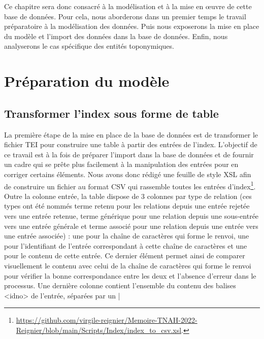 \documentclass[a4paper,12pt,twoside]{book}
\begin{document}
	Ce chapitre sera donc consacré à la modélisation et à la mise en œuvre de cette base de données. Pour cela, nous aborderons dans un premier temps le travail préparatoire à la modélisation des données. Puis nous exposerons la mise en place du modèle et l'import des données dans la base de données. Enfin, nous analyserons le cas spécifique des entités toponymiques.
	
	\section{Préparation du modèle}
	
	\subsection{Transformer l'index sous forme de table}
	
	La première étape de la mise en place de la base de données est de transformer le fichier TEI pour construire une table à partir des entrées de l'index. L'objectif de ce travail est à la fois de préparer l'import dans la base de données et de fournir un cadre qui se prête plus facilement à la manipulation des entrées pour en corriger certains éléments. Nous avons donc rédigé une feuille de style XSL afin de construire un fichier au format CSV qui rassemble toutes les entrées d'index\footnote{\url{https://github.com/virgile-reignier/Memoire-TNAH-2022-Reignier/blob/main/Scripts/Index/index_to_csv.xsl}.}. Outre la colonne \og entrée\fg{}, la table dispose de 3 colonnes par type de relation (ces types ont été nommés \og terme retenu\fg{} pour les relations depuis une entrée rejetée vers une entrée retenue, \og terme générique\fg{} pour une relation depuis une sous-entrée vers une entrée générale et \og terme associé\fg{} pour une relation depuis une entrée vers une entrée associée) : une pour la chaîne de caractères qui forme le renvoi, une pour l'identifiant de l'entrée correspondant à cette chaîne de caractères et une pour le contenu de cette entrée. Ce dernier élément permet ainsi de comparer visuellement le contenu avec celui de la chaîne de caractères qui forme le renvoi pour vérifier la bonne correspondance entre les deux et l'absence d'erreur dans le processus. Une dernière colonne contient l'ensemble du contenu des balises <idno> de l'entrée, séparées par un \og | \fg{}
	
\end{document}
